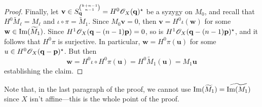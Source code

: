 \documentclass[fleqn,reqno]{amsart}
\numberwithin{first}{chapter}
\numberwithin{section}{chapter}
\numberwithin{equation}{first}
\begin{document}
\begin{proof}
	Finally, let $\mathbf v\in S_{\mathbf q}^{\binom{k+n-1}{n-1}}=H^0\mathscr{O}_X(\mathbf q)^\star$ be
	a syzygy on $M_0$,
	and recall that $H^0\widetilde{M}_\ell=M_\ell$ and
	$\iota\circ\pi=\widetilde{M}_1$.
	Since $M_0 \mathbf v=0$, then $\mathbf v=H^0\iota(\mathbf w)$
	for some $\mathbf w\in \operatorname{Im}(\widetilde{M}_1)$.
	Since $H^1\mathscr{O}_X(\mathbf q-(n-1)\mathbf p)=0$,
	so is $H^1\mathscr{O}_X(\mathbf q-(n-1)\mathbf p)^\star$,
	and it follows that $H^0\pi$ is surjective.
	In particular, $\mathbf w=H^0\pi(\mathbf u)$ for some $u\in H^0\mathscr{O}_X(\mathbf q-\mathbf p)^\star$.
	But then
	\[
		\mathbf w=H^0\iota\circ H^0\pi(\mathbf u)=H^0\widetilde{M}_1(\mathbf u)=M_1\mathbf u
	\]
	establishing the claim.
\end{proof}

\begin{remarkhint}
Note that, in the last paragraph of the proof,
we cannot use $\operatorname{Im}(\widetilde{M}_1)=\widetilde{\operatorname{Im}(M_1)}$
since $X$ isn't affine---this is the whole point of the proof.
\end{remarkhint}
\end{document}

